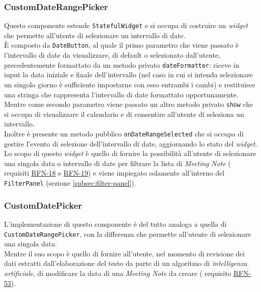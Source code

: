 \subsubsection*{CustomDateRangePicker}
\label{subsubsec:custom-date-range-picker}

Questo componente estende \lstinline{StatefulWidget} e si occupa di costruire un \emph{widget} che permette all'utente di selezionare un intervallo di date.\\
È composto da \lstinline{DateButton}, al quale il primo parametro che viene passato è l'intervallo di date da visualizzare, di default o selezionato dall'utente, precedentemente formattato da un metodo privato \lstinline{dateFormatter}: riceve in input la data iniziale e finale dell'intervallo (nel caso in cui si intenda selezionare un singolo giorno è sufficiente impostarne con esso entrambi i cambi) e restituisce una stringa che rappresenta l'intervallo di date formattato opportunamente.\\
Mentre come secondo parametro viene passato un altro metodo privato \lstinline{show} che si occupa di visualizzare il calendario e di consentire all'utente di seleziona un intervallo. \\
Inoltre è presente un metodo pubblico \lstinline{onDateRangeSelected} che si occupa di gestire l'evento di selezione dell'intervallo di date, aggiornando lo stato del \emph{widget}. \\
Lo scopo di questo \emph{widget} è quello di fornire la possibilità all'utente di selezionare una singola data o intervallo di date per filtrare la lista di \emph{Meeting Note} ( requisiti \hyperref[RFN-18]{RFN-18} e \hyperref[RFN-19]{RFN-19}) e viene impiegato solamente all'interno del \lstinline{FilterPanel} (sezione \ref{subsec:filter-panel}).

\subsubsection*{CustomDatePicker}
\label{subsubsec:custom-date-picker}

L'implementazione di questo componente è del tutto analoga a quella di \lstinline{CustomDateRangePicker}, con la differenza che permette all'utente di selezionare una singola data.\\
Mentre il suo scopo è quello di fornire all'utente, nel momento di revisione dei dati estratti dall'elaborazione del testo da parte di un algoritmo di \emph{intelligenza artificiale}, di modificare la data di una \emph{Meeting Note} da creare ( requisito \hyperref[RFN-53]{RFN-53}).

